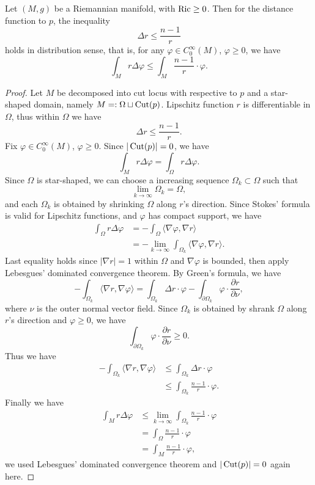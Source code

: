 \begin{thm}
    Let $(M,g)$ be a Riemannian manifold, with $\operatorname{Ric}\geq 0$.
    Then for the distance function to $p$, the inequality
    \[\Delta r\leq\frac{n-1}{r}\]
    holds in distribution sense, that is, for any $\varphi\in C^\infty_0(M)$, $\varphi\geq 0$, we have
    \[\int_Mr\Delta\varphi\leq\int_M\frac{n-1}{r}\cdot\varphi.\]
\end{thm}
\begin{proof}
    Let $M$ be decomposed into cut locus with respective to $p$ and a star-shaped domain, namely $M=:\Omega\sqcup\operatorname{Cut}(p)$.
    Lipschitz function $r$ is differentiable in $\Omega$, thus within $\Omega$ we have
    \[\Delta r\leq\frac{n-1}{r}.\]
    Fix $\varphi\in C^\infty_0(M)$, $\varphi\geq 0$.
    Since $|\operatorname{Cut}(p)|=0$, we have
    \[\int_Mr\Delta\varphi=\int_\Omega r\Delta\varphi.\]
    Since $\Omega$ is star-shaped, we can choose a increasing sequence $\Omega_k\subset\Omega$ such that
    \[\lim_{k\to\infty}\Omega_k=\Omega,\]
    and each $\Omega_k$ is obtained by shrinking $\Omega$ along $r$'s direction.
    Since Stokes' formula is valid for Lipschitz functions, and $\varphi$ has compact support, we have
    \begin{align*}
        \int_\Omega r\Delta\varphi&=-\int_\Omega\langle\nabla\varphi,\nabla r\rangle\\
        &=-\lim_{k\to\infty}\int_{\Omega_k}\langle\nabla\varphi,\nabla r\rangle.
    \end{align*}
    Last equality holds since $|\nabla r|=1$ within $\Omega$ and $\nabla\varphi$ is bounded, then apply Lebesgues' dominated convergence theorem.
    By Green's formula, we have
    \[-\int_{\Omega_k}\langle\nabla r,\nabla\varphi\rangle=\int_{\Omega_k}\Delta r\cdot\varphi-\int_{\partial\Omega_k}\varphi\cdot\frac{\partial r}{\partial\nu},\]
    where $\nu$ is the outer normal vector field.
    Since $\Omega_k$ is obtained by shrank $\Omega$ along $r$'s direction and $\varphi\geq 0$, we have
    \[\int_{\partial\Omega_k}\varphi\cdot\frac{\partial r}{\partial\nu}\geq 0.\]
    Thus we have
    \begin{align*}
        -\int_{\Omega_k}\langle\nabla r,\nabla\varphi\rangle&\leq\int_{\Omega_k}\Delta r\cdot\varphi\\
        &\leq\int_{\Omega_k}\frac{n-1}{r}\cdot\varphi.
    \end{align*}
    Finally we have
    \begin{align*}
        \int_Mr\Delta\varphi&\leq\lim_{k\to\infty}\int_{\Omega_k}\frac{n-1}{r}\cdot\varphi\\
        &=\int_{\Omega}\frac{n-1}{r}\cdot\varphi\\
        &=\int_M\frac{n-1}{r}\cdot\varphi,
    \end{align*}
    we used Lebesgues' dominated convergence theorem and $|\operatorname{Cut}(p)|=0$ again here.
\end{proof}
